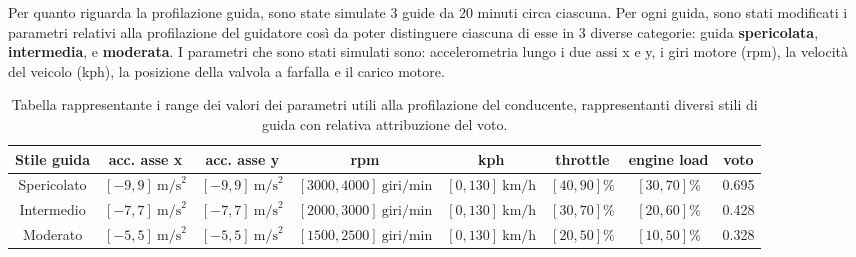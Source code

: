 \documentclass[12pt, a4paper, italian]{report}
\numberwithin{figure}{chapter}
\numberwithin{table}{chapter}
\begin{document}
Per quanto riguarda la profilazione guida, sono state simulate 3 guide da 20 minuti circa ciascuna. Per ogni guida, sono stati modificati i parametri relativi alla profilazione del guidatore così da poter distinguere ciascuna di esse in 3 diverse categorie: guida \textbf{spericolata}, \textbf{intermedia},  e \textbf{moderata}. I parametri che sono stati simulati sono: accelerometria lungo i due assi x e y, i giri motore (rpm), la velocità del veicolo (kph), la posizione della valvola a farfalla e il carico motore. 

\begin{table}[h!]
  \centering 
  \begin{adjustbox}{max width=\textwidth}
    \begin{tabular}{|c|c|c|c|c|c|c|c|}
      \hline
      \textbf{Stile guida} & \textbf{acc. asse x} & \textbf{acc. asse y} & \textbf{rpm} & \textbf{kph} & \textbf{throttle} & \textbf{engine load} & \textbf{voto} \\
      \hline
      Spericolato & $[-9,9] \ \text{m/s}^2$ & $[-9,9] \ \text{m/s}^2$ & $[3000,4000] \ \text{giri/min}$ & $[0,130] \ \text{km/h}$ & $[40,90] \%$ & $[30,70] \%$  & 0.695\\
      \hline
      Intermedio & $[-7,7] \ \text{m/s}^2$ & $[-7,7] \ \text{m/s}^2$ & $[2000,3000] \ \text{giri/min}$ & $[0,130] \ \text{km/h}$ & $[30,70] \%$ & $[20,60] \%$  & 0.428\\
      \hline
      Moderato & $[-5,5] \ \text{m/s}^2$ & $[-5,5] \ \text{m/s}^2$ & $[1500,2500] \ \text{giri/min}$ & $[0,130] \ \text{km/h}$ & $[20,50] \%$ & $[10,50] \%$  & 0.328\\
      \hline
    \end{tabular}
  \end{adjustbox}
  \caption{Tabella rappresentante i range dei valori dei parametri utili alla profilazione del conducente, rappresentanti diversi stili di guida con relativa attribuzione del voto.}
  \label{tab:stili_di_guida}
\end{table}
\end{document}
